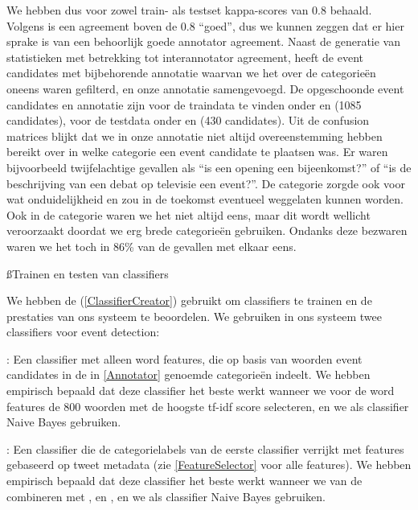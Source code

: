 {{We hebben dus voor zowel train- als testset kappa-scores van 0.8 behaald. Volgens \citet{manning2008introduction} is 
een agreement boven de 0.8 ``goed'', dus we kunnen zeggen dat er hier sprake is van een behoorlijk goede annotator agreement.
\vl
Naast de generatie van statistieken met betrekking tot interannotator agreement, heeft  de event candidates
met bijbehorende annotatie waarvan we het over de categorie\"en oneens waren gefilterd, en onze 
annotatie samengevoegd. De opgeschoonde event candidates en annotatie zijn voor de traindata te vinden onder 
 en  (1085 candidates), voor de testdata onder 
 en  (430 candidates).
\vl
Uit de confusion matrices blijkt dat we in onze annotatie niet altijd overeenstemming hebben bereikt over in welke categorie
een event candidate te plaatsen was. Er waren bijvoorbeeld twijfelachtige gevallen als 
``is een opening een bijeenkomst?'' of ``is de beschrijving van een debat op televisie een event?''. De categorie 
zorgde ook voor wat onduidelijkheid en zou in de toekomst eventueel weggelaten kunnen worden. Ook in de categorie 
waren we het niet altijd eens, maar dit wordt wellicht veroorzaakt doordat we erg brede categorie\"en gebruiken. Ondanks deze bezwaren
waren we het toch in 86\% van de gevallen met elkaar eens.

\ss{Trainen en testen van classifiers}\label{traintest}

We hebben de  (\ref{ClassifierCreator}) gebruikt om classifiers te trainen en de prestaties van ons systeem te
beoordelen. We gebruiken in ons systeem twee classifiers voor event detection:
\begin{bullets}
\item {}: Een classifier met alleen word features, die op basis van woorden event candidates in de in \ref{Annotator} genoemde 
categorie\"en indeelt. We hebben empirisch bepaald dat deze classifier het beste werkt wanneer we voor de word features de
800 woorden met de hoogste tf-idf score selecteren, en we als classifier Naive Bayes gebruiken.
\item {}: Een classifier die de categorielabels van de eerste classifier verrijkt met features gebaseerd op tweet metadata (zie \ref{FeatureSelector}
voor alle features). We hebben empirisch bepaald dat deze classifier het beste werkt wanneer we  van de 
combineren met ,  en , en we als classifier Naive Bayes gebruiken.
\end{bullets}

}}
